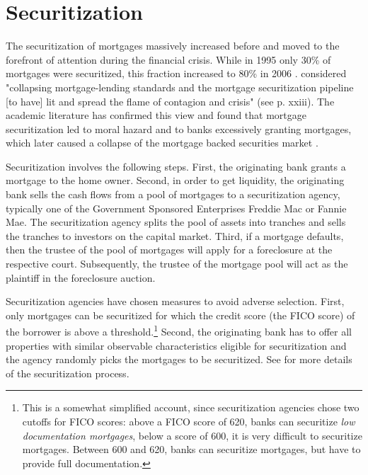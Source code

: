 \documentclass[11pt,twopage]{article}
\begin{document}

\section{Securitization}
\label{sec:securitization}


The securitization of mortgages massively increased before and moved
to the forefront of attention during the financial crisis. While in
1995 only 30\% of mortgages were securitized, this fraction increased
to 80\% in 2006 \cite[p. 19]{dewatripont2010balancing}. \cite{angelides2011financial} considered "collapsing
mortgage-lending standards and the mortgage securitization pipeline
[to have] lit and spread the flame of contagion and crisis" (see p. xxiii).  The
academic literature has confirmed this view and found that mortgage
securitization led to moral hazard and to banks excessively granting
mortgages, which later caused a collapse of the mortgage backed
securities market \cite{mian2009consequences,dewatripont2010balancing,keys2008did}.

Securitization involves the following steps. First, the originating
bank grants a mortgage to the home owner. Second, in order to get
liquidity, the originating bank sells the cash flows from a pool of
mortgages to a securitization agency, typically one of the Government
Sponsored Enterprises Freddie Mac or Fannie Mae. The securitization
agency splits the pool of assets into tranches and sells the tranches
to investors on the capital market. Third, if a mortgage defaults,
then the trustee of the pool of mortgages will apply for a foreclosure
at the respective court. Subsequently, the trustee of the mortgage
pool will act as the plaintiff in the foreclosure auction.

Securitization agencies have chosen measures to avoid adverse
selection. First, only mortgages can be securitized for which the
credit score (the FICO score) of the borrower is above a
threshold.\footnote{This is a somewhat simplified account, since
  securitization agencies chose two cutoffs for FICO scores: above a
  FICO score of 620, banks can securitize \emph{low documentation
    mortgages}, below a score of 600, it is very difficult to
  securitize mortgages. Between 600 and 620, banks can securitize
  mortgages, but have to provide full documentation.}  Second, the
originating bank has to offer all properties with similar observable
characteristics eligible for securitization and the agency randomly
picks the mortgages to be securitized. See \cite{keys2008did} for more
details of the securitization process.
\end{document}
